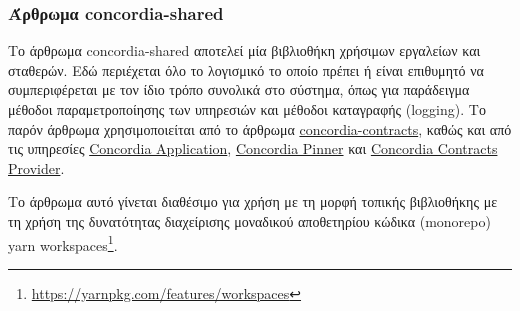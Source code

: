 \subsubsection{Άρθρωμα concordia-shared} \label{subsubsection:4-3-1-concordia-shared-unit}

Το άρθρωμα concordia-shared αποτελεί μία βιβλιοθήκη χρήσιμων εργαλείων και σταθερών. Εδώ περιέχεται όλο το λογισμικό το οποίο πρέπει ή είναι επιθυμητό να συμπεριφέρεται με τον ίδιο τρόπο συνολικά στο σύστημα, όπως για παράδειγμα μέθοδοι παραμετροποίησης των υπηρεσιών και μέθοδοι καταγραφής (logging). Το παρόν άρθρωμα χρησιμοποιείται από το άρθρωμα \hyperref[subsubsection:4-3-1-concordia-contracts-unit]{concordia-contracts}, καθώς και από τις υπηρεσίες \hyperref[subsection:4-3-2-concordia-application-service]{Concordia Application}, \hyperref[subsection:4-3-4-concordia-pinner-service]{Concordia Pinner} και \hyperref[subsection:4-3-5-concordia-contracts-provider-service]{Concordia Contracts Provider}.

Το άρθρωμα αυτό γίνεται διαθέσιμο για χρήση με τη μορφή τοπικής βιβλιοθήκης με τη χρήση της δυνατότητας διαχείρισης μοναδικού αποθετηρίου κώδικα (monorepo) yarn workspaces{\footnote{\url{https://yarnpkg.com/features/workspaces}}}.